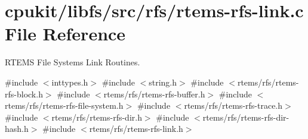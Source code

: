 \hypertarget{rtems-rfs-link_8c}{}\section{cpukit/libfs/src/rfs/rtems-\/rfs-\/link.c File Reference}
\label{rtems-rfs-link_8c}


R\+T\+E\+MS File Systems Link Routines.  


{\ttfamily \#include $<$inttypes.\+h$>$}\newline
{\ttfamily \#include $<$string.\+h$>$}\newline
{\ttfamily \#include $<$rtems/rfs/rtems-\/rfs-\/block.\+h$>$}\newline
{\ttfamily \#include $<$rtems/rfs/rtems-\/rfs-\/buffer.\+h$>$}\newline
{\ttfamily \#include $<$rtems/rfs/rtems-\/rfs-\/file-\/system.\+h$>$}\newline
{\ttfamily \#include $<$rtems/rfs/rtems-\/rfs-\/trace.\+h$>$}\newline
{\ttfamily \#include $<$rtems/rfs/rtems-\/rfs-\/dir.\+h$>$}\newline
{\ttfamily \#include $<$rtems/rfs/rtems-\/rfs-\/dir-\/hash.\+h$>$}\newline
{\ttfamily \#include $<$rtems/rfs/rtems-\/rfs-\/link.\+h$>$}\newline
